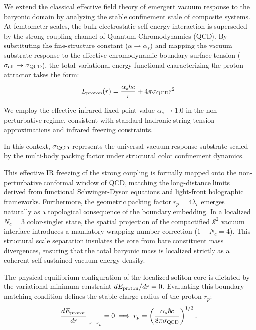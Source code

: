 \documentclass[
  reprint,
  aps,
  prd,
  twocolumn,
  superscriptaddress,
  nofootinbib,
  floatfix
]{revtex4-2}
\begin{document}
We extend the classical effective field theory of emergent 
vacuum response to the baryonic domain by analyzing the stable 
confinement scale of composite systems. At femtometer scales, 
the bulk electrostatic self-energy interaction is superseded 
by the strong coupling channel of Quantum Chromodynamics (QCD). 
By substituting the fine-structure constant ($\alpha \to \alpha_s$) 
and mapping the vacuum substrate response to the effective 
chromodynamic boundary surface tension ($\sigma_{\rm eff} \to 
\sigma_{\rm QCD}$), the total variational energy functional 
characterizing the proton attractor takes the form:
\begin{equation}
\label{eq:E_proton}
E_{\rm proton}(r) = \frac{\alpha_s \hbar c}{r} + 
4\pi \sigma_{\rm QCD} r^2
\end{equation}

We employ the effective infrared fixed-point value $\alpha_s \to 1.0$ 
in the non-perturbative regime, consistent with standard hadronic 
string-tension approximations and infrared freezing constraints. 

In this context, $\sigma_{\rm QCD}$ represents the universal 
vacuum response substrate scaled by the multi-body packing factor 
under structural color confinement dynamics.

This effective IR freezing of the strong coupling 
is formally mapped onto the non-perturbative 
conformal window of QCD, matching the long-distance 
limits derived from functional Schwinger-Dyson 
equations and light-front holographic frameworks. 
Furthermore, the geometric packing factor $r_p = 4\lambda_c$ 
emerges naturally as a topological consequence 
of the boundary embedding. In a localized $N_c=3$ 
color-singlet state, the spatial projection of the 
compactified $\mathcal{S}^2$ vacuum interface 
introduces a mandatory wrapping number correction 
($1 + N_c = 4$). This structural scale separation 
insulates the core from bare constituent mass 
divergences, ensuring that the total baryonic mass 
is localized strictly as a coherent self-sustained 
vacuum energy density.



The physical equilibrium configuration of the localized soliton 
core is dictated by the variational minimum constraint 
$dE_{\rm proton}/dr = 0$. Evaluating this boundary matching 
condition defines the stable charge radius of the proton $r_p$:
\begin{equation}
\label{eq:rp_analytical}
\left. \frac{dE_{\rm proton}}{dr} \right|_{r=r_p} = 0 
\implies r_p = \left( \frac{\alpha_s \hbar c}{8\pi \sigma_{\rm QCD}} 
\right)^{1/3}.
\end{equation}
\end{document}
